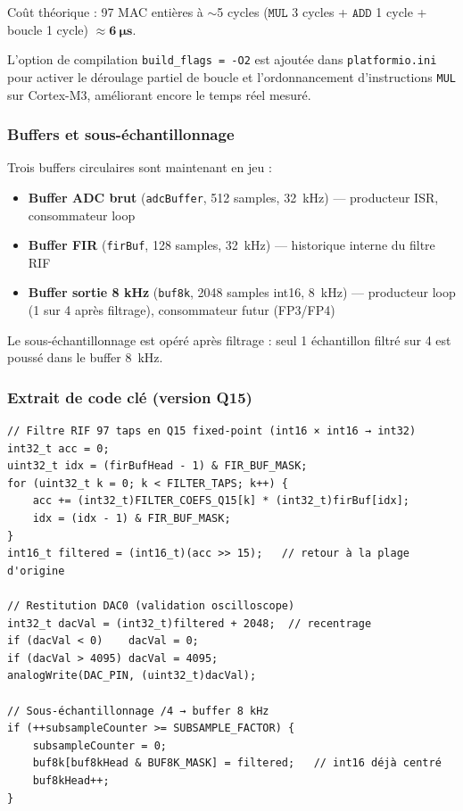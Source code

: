 Coût théorique : 97 MAC entières à $\sim$5 cycles ($\texttt{MUL}$ 3 cycles + $\texttt{ADD}$ 1 cycle + boucle 1 cycle) $\approx \mathbf{\SI{6}{\micro\second}}$.

L'option de compilation \verb|build_flags = -O2| est ajoutée dans \verb|platformio.ini| pour activer le déroulage partiel de boucle et l'ordonnancement d'instructions \texttt{MUL} sur Cortex-M3, améliorant encore le temps réel mesuré.

\subsubsection{Buffers et sous-échantillonnage}

Trois buffers circulaires sont maintenant en jeu :
\begin{itemize}
    \item \textbf{Buffer ADC brut} (\texttt{adcBuffer}, 512 samples, \SI{32}{\kilo\hertz}) --- producteur ISR, consommateur loop
    \item \textbf{Buffer FIR} (\texttt{firBuf}, 128 samples, \SI{32}{\kilo\hertz}) --- historique interne du filtre RIF
    \item \textbf{Buffer sortie 8 kHz} (\texttt{buf8k}, 2048 samples int16, \SI{8}{\kilo\hertz}) --- producteur loop (1 sur 4 après filtrage), consommateur futur (FP3/FP4)
\end{itemize}

Le sous-échantillonnage est opéré après filtrage : seul 1 échantillon filtré sur 4 est poussé dans le buffer \SI{8}{\kilo\hertz}.

\subsubsection{Extrait de code clé (version Q15)}

\begin{lstlisting}[style=cpp, caption={Convolution RIF en Q15 + sous-échantillonnage dans la boucle principale.}]
// Filtre RIF 97 taps en Q15 fixed-point (int16 × int16 → int32)
int32_t acc = 0;
uint32_t idx = (firBufHead - 1) & FIR_BUF_MASK;
for (uint32_t k = 0; k < FILTER_TAPS; k++) {
    acc += (int32_t)FILTER_COEFS_Q15[k] * (int32_t)firBuf[idx];
    idx = (idx - 1) & FIR_BUF_MASK;
}
int16_t filtered = (int16_t)(acc >> 15);   // retour à la plage d'origine

// Restitution DAC0 (validation oscilloscope)
int32_t dacVal = (int32_t)filtered + 2048;  // recentrage
if (dacVal < 0)    dacVal = 0;
if (dacVal > 4095) dacVal = 4095;
analogWrite(DAC_PIN, (uint32_t)dacVal);

// Sous-échantillonnage /4 → buffer 8 kHz
if (++subsampleCounter >= SUBSAMPLE_FACTOR) {
    subsampleCounter = 0;
    buf8k[buf8kHead & BUF8K_MASK] = filtered;   // int16 déjà centré
    buf8kHead++;
}
\end{lstlisting}

